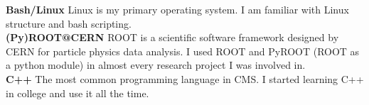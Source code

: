 \documentclass[14pt]{article} %
\begin{document}
\textbf{Bash/Linux}
\small{
Linux is my primary operating system. I am familiar with Linux structure and bash scripting.
}\\


\textbf{(Py)ROOT@CERN}
\small{
ROOT is a scientific software framework designed by CERN for particle physics data analysis. I used ROOT and PyROOT (ROOT as a python module) in almost every research project I was involved in.
}\\


\textbf{C++}
\small{
The most common programming language in CMS. I started learning C++ in college and use it all the time.
}
\end{document}
